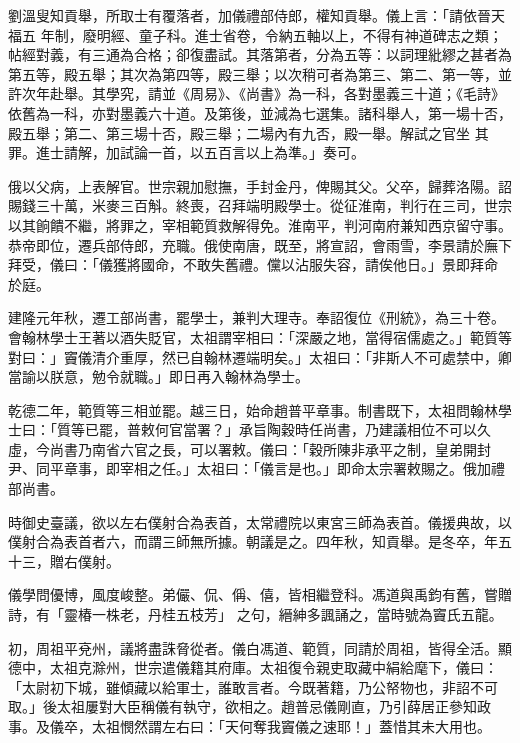 \begin{pinyinscope}
 劉溫叟知貢舉，所取士有覆落者，加儀禮部侍郎，權知貢舉。儀上言：「請依晉天福五
 年制，廢明經、童子科。進士省卷，令納五軸以上，不得有神道碑志之類；帖經對義，有三通為合格；卻復盡試。其落第者，分為五等：以詞理紕繆之甚者為第五等，殿五舉；其次為第四等，殿三舉；以次稍可者為第三、第二、第一等，並許次年赴舉。其學究，請並《周易》、《尚書》為一科，各對墨義三十道；《毛詩》依舊為一科，亦對墨義六十道。及第後，並減為七選集。諸科舉人，第一場十否，殿五舉；第二、第三場十否，殿三舉；二場內有九否，殿一舉。解試之官坐
 其罪。進士請解，加試論一首，以五百言以上為準。」奏可。



 俄以父病，上表解官。世宗親加慰撫，手封金丹，俾賜其父。父卒，歸葬洛陽。詔賜錢三十萬，米麥三百斛。終喪，召拜端明殿學士。從征淮南，判行在三司，世宗以其餉饋不繼，將罪之，宰相範質救解得免。淮南平，判河南府兼知西京留守事。恭帝即位，遷兵部侍郎，充職。俄使南唐，既至，將宣詔，會雨雪，李景請於廡下拜受，儀曰：「儀獲將國命，不敢失舊禮。儻以沾服失容，請俟他日。」景即拜命
 於庭。



 建隆元年秋，遷工部尚書，罷學士，兼判大理寺。奉詔復位《刑統》，為三十卷。會翰林學士王著以酒失貶官，太祖謂宰相曰：「深嚴之地，當得宿儒處之。」範質等對曰：」竇儀清介重厚，然已自翰林遷端明矣。」太祖曰：「非斯人不可處禁中，卿當諭以朕意，勉令就職。」即日再入翰林為學士。



 乾德二年，範質等三相並罷。越三日，始命趙普平章事。制書既下，太祖問翰林學士曰：「質等已罷，普敕何官當署？」承旨陶穀時任尚書，乃建議相位不可以久
 虛，今尚書乃南省六官之長，可以署敕。儀曰：「穀所陳非承平之制，皇弟開封尹、同平章事，即宰相之任。」太祖曰：「儀言是也。」即命太宗署敕賜之。俄加禮部尚書。



 時御史臺議，欲以左右僕射合為表首，太常禮院以東宮三師為表首。儀援典故，以僕射合為表首者六，而謂三師無所據。朝議是之。四年秋，知貢舉。是冬卒，年五十三，贈右僕射。



 儀學問優博，風度峻整。弟儼、侃、偁、僖，皆相繼登科。馮道與禹鈞有舊，嘗贈詩，有「靈椿一株老，丹桂五枝芳」
 之句，縉紳多諷誦之，當時號為竇氏五龍。



 初，周祖平兗州，議將盡誅脅從者。儀白馮道、範質，同請於周祖，皆得全活。顯德中，太祖克滁州，世宗遣儀籍其府庫。太祖復令親吏取藏中絹給麾下，儀曰：「太尉初下城，雖傾藏以給軍士，誰敢言者。今既著籍，乃公帑物也，非詔不可取。」後太祖屢對大臣稱儀有執守，欲相之。趙普忌儀剛直，乃引薛居正參知政事。及儀卒，太祖憫然謂左右曰：「天何奪我竇儀之速耶！」蓋惜其未大用也。




\end{pinyinscope}
